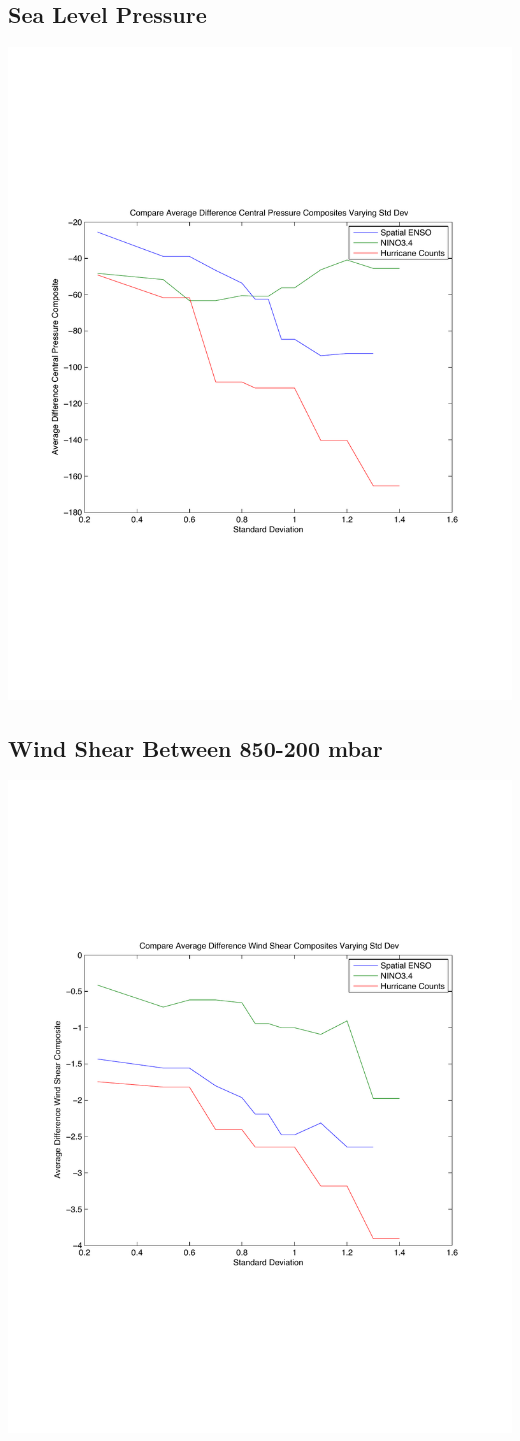 \documentclass[11pt]{article}
\begin{document}
\subsection{Sea Level Pressure}
\includegraphics[scale = 0.6]{images/varyingStdDevForCompositesCentralPressure.pdf}

\subsection{Wind Shear Between 850-200 mbar}
\includegraphics[scale=.6]{images/varyingStdDevForCompositesWindShear.pdf}
\end{document}
